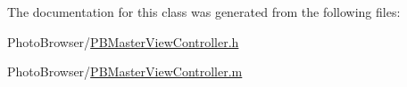 The documentation for this class was generated from the following files:\begin{DoxyCompactItemize}
\item 
PhotoBrowser/\hyperlink{_p_b_master_view_controller_8h}{PBMasterViewController.h}\item 
PhotoBrowser/\hyperlink{_p_b_master_view_controller_8m}{PBMasterViewController.m}\end{DoxyCompactItemize}
